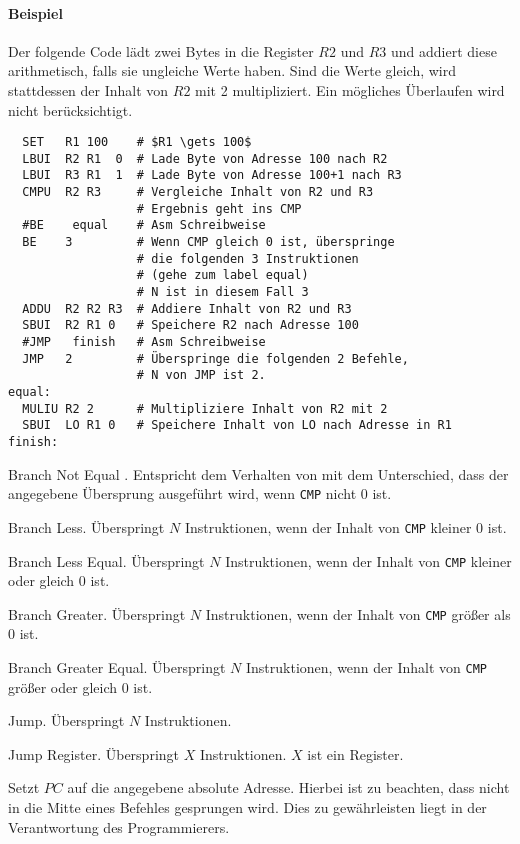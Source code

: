 \paragraph{Beispiel}
Der folgende Code lädt zwei Bytes in die Register $R2$ und $R3$ und addiert
diese arithmetisch, falls sie ungleiche Werte haben. Sind die Werte gleich,
wird stattdessen der Inhalt von $R2$ mit 2 multipliziert. Ein mögliches
Überlaufen wird nicht berücksichtigt.
\begin{lstlisting}
  SET   R1 100    # $R1 \gets 100$
  LBUI  R2 R1  0  # Lade Byte von Adresse 100 nach R2
  LBUI  R3 R1  1  # Lade Byte von Adresse 100+1 nach R3
  CMPU  R2 R3     # Vergleiche Inhalt von R2 und R3
                  # Ergebnis geht ins CMP
  #BE    equal    # Asm Schreibweise
  BE    3         # Wenn CMP gleich 0 ist, überspringe 
                  # die folgenden 3 Instruktionen
                  # (gehe zum label equal)
                  # N ist in diesem Fall 3
  ADDU  R2 R2 R3  # Addiere Inhalt von R2 und R3
  SBUI  R2 R1 0   # Speichere R2 nach Adresse 100
  #JMP   finish   # Asm Schreibweise
  JMP   2         # Überspringe die folgenden 2 Befehle, 
                  # N von JMP ist 2.
equal:
  MULIU R2 2      # Multipliziere Inhalt von R2 mit 2
  SBUI  LO R1 0   # Speichere Inhalt von LO nach Adresse in R1
finish:
\end{lstlisting}



\glqq Branch Not Equal \grqq.
Entspricht dem Verhalten von  mit dem Unterschied, dass der angegebene
Übersprung ausgeführt wird, wenn \texttt{CMP} nicht $0$ ist.


\glqq Branch Less\grqq. 
Überspringt $N$ Instruktionen, wenn der Inhalt von \texttt{CMP} kleiner $0$ ist.


\glqq Branch Less Equal\grqq.
Überspringt $N$ Instruktionen, wenn der Inhalt von \texttt{CMP} kleiner oder
gleich $0$ ist.


\glqq Branch Greater\grqq.
Überspringt $N$ Instruktionen, wenn der Inhalt von \texttt{CMP} größer als
$0$ ist.


\glqq Branch Greater Equal\grqq. 
Überspringt $N$ Instruktionen, wenn der Inhalt von \texttt{CMP} größer oder
gleich $0$ ist.


\glqq Jump\grqq.
Überspringt $N$ Instruktionen.

\glqq Jump Register\grqq.
Überspringt $X$ Instruktionen. $X$ ist ein Register.


Setzt $PC$ auf die angegebene absolute Adresse. Hierbei ist zu beachten,  dass
nicht in die Mitte eines Befehles gesprungen wird. Dies zu gewährleisten liegt
in der Verantwortung des Programmierers.

